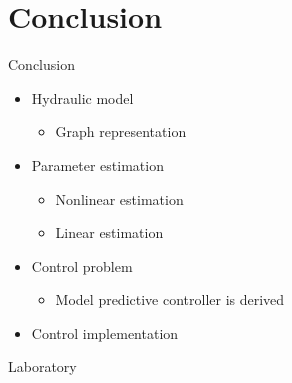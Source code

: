 


\section{Conclusion}


\begin{frame}{Conclusion}{}


\begin{itemize}
\item<1-> Hydraulic model 
\begin{itemize}
\item Graph representation
\end{itemize}

\item<1-> Parameter estimation 
\begin{itemize}
\item Nonlinear estimation
\item Linear estimation
\end{itemize}

\item<1-> Control problem
\begin{itemize}
\item Model predictive controller is derived
\end{itemize}

\item<1-> Control implementation
\end{itemize}

\end{frame}





\begin{frame}{Laboratory}{}
\end{frame}
